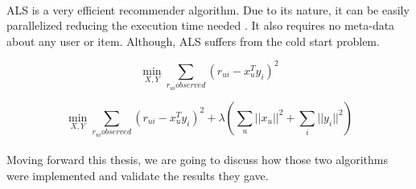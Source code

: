 \paragraph{} ALS is a very efficient recommender algorithm. Due to its nature, it can be easily parallelized reducing the execution time needed \cite{DistributedAlgorithmsAndOptimization:4}. It also requires no meta-data about any user or item. Although, ALS suffers from the cold start problem.

\begin{equation}
	\min_{X,Y} \sum_{r_{ui}observed}(r_{ui}-x_{u}^{T}y_{i})^{2}
\end{equation}

\begin{equation}
	\min_{X,Y} \sum_{r_{ui}observed}(r_{ui}-x_{u}^{T}y_{i})^{2} + \lambda(\sum_{u}||x_{u}||^2 + \sum_{i}||y_{i}||^2)
\end{equation}

\paragraph{} Moving forward this thesis, we are going to discuss how those two algorithms were implemented and validate the results they gave.